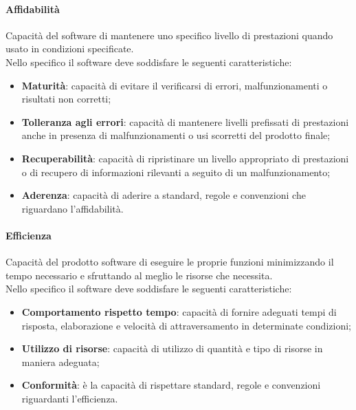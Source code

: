 		\paragraph{Affidabilità}
		Capacità del software di mantenere uno specifico livello di prestazioni quando usato in condizioni specificate.\\
		Nello specifico il software deve soddisfare le seguenti caratteristiche:
		\begin{itemize}
			\item \textbf{Maturità}: capacità di evitare il verificarsi di errori, malfunzionamenti o risultati non corretti;
			\item \textbf{Tolleranza agli errori}: capacità di mantenere livelli prefissati di prestazioni anche in presenza di malfunzionamenti o usi scorretti del prodotto finale;
			\item \textbf{Recuperabilità}: capacità di ripristinare un livello appropriato di prestazioni o di recupero di informazioni rilevanti a seguito di un malfunzionamento;
			\item \textbf{Aderenza}:  capacità di aderire a standard, regole e convenzioni che riguardano l'affidabilità.
		\end{itemize}
		\paragraph{Efficienza}
		Capacità del prodotto software di eseguire le proprie funzioni minimizzando il tempo necessario e sfruttando al meglio le risorse che necessita.\\
		Nello specifico il software deve soddisfare le seguenti caratteristiche:
		\begin{itemize}
			\item \textbf{Comportamento rispetto tempo}: capacità di fornire adeguati tempi di risposta, elaborazione e velocità di attraversamento in determinate condizioni;
			\item \textbf{Utilizzo di risorse}: capacità di utilizzo di quantità e tipo di risorse in maniera adeguata;
			\item \textbf{Conformità}: è la capacità di rispettare standard, regole e convenzioni riguardanti l'efficienza.
		\end{itemize}
